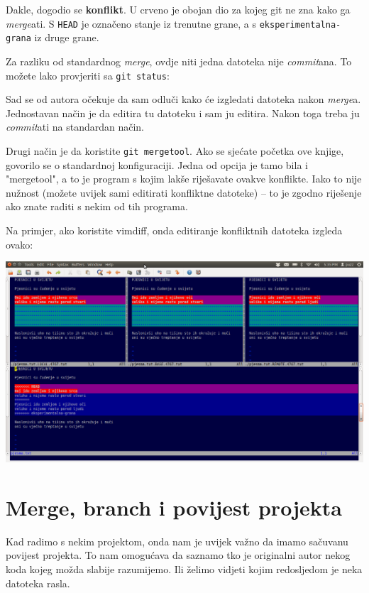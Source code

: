 Dakle, dogodio se \textbf{konflikt}. 
U crveno je obojan dio za kojeg git ne zna kako ga \emph{merge}ati.
S \verb+HEAD+ je označeno stanje iz trenutne grane, a s \verb+eksperimentalna-grana+ iz druge grane.

Za razliku od standardnog \emph{merge}, ovdje niti jedna datoteka nije \emph{commit}ana. 
To možete lako provjeriti sa \verb+git status+:



Sad se od autora očekuje da sam odluči kako će izgledati datoteka nakon \emph{merge}a.
Jednostavan način je da editira tu datoteku i sam ju editira.
Nakon toga treba ju \emph{commit}ati na standardan način.

Drugi način je da koristite \verb+git mergetool+.
Ako se sjećate početka ove knjige, govorilo se o standardnoj konfiguraciji. 
Jedna od opcija je tamo bila i "mergetool", a to je program s kojim lakše riješavate ovakve konflikte.
Iako to nije nužnost (možete uvijek sami editirati konfliktne datoteke) -- to je zgodno riješenje ako znate raditi s nekim od tih programa.

Na primjer, ako koristite vimdiff, onda editiranje konfliktnih datoteka izgleda ovako:

\includegraphics[width=14cm]{images/mergetool.png}

\section*{Merge, branch i povijest projekta}

Kad radimo s nekim projektom, onda nam je uvijek važno da imamo sačuvanu povijest projekta.
To nam omogućava da saznamo tko je originalni autor nekog koda kojeg možda slabije razumijemo.
Ili želimo vidjeti kojim redosljedom je neka datoteka rasla.

